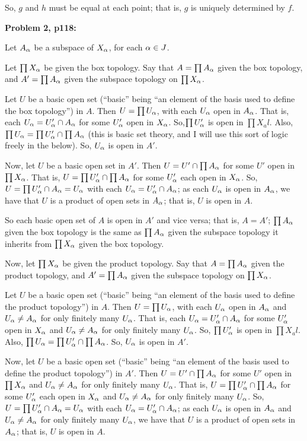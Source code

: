 \documentclass[a4paper,12pt]{article}
\begin{document}
So, $g$ and $h$ must be equal at each point; that is, $g$ is uniquely determined by $f$.

\shunt

{\bf Problem 2, p118:}

Let $A_\alpha$ be a subspace of $X_\alpha$, for each $\alpha \in J$. 

Let $\prod X_\alpha$ be given the box topology. Say that $A = \prod A_\alpha$ given the box topology, and $A' = \prod A_\alpha$ given the subspace topology on $\prod X_\alpha$.

Let $U$ be a basic open set (``basic'' being ``an element of the basis used to define the box topology'') in $A$. Then $U = \prod U_\alpha$, with each $U_\alpha$ open in $A_\alpha$. That is, each $U_\alpha = U'_\alpha \cap A_\alpha$ for some $U'_\alpha$ open in $X_\alpha$. So,$\prod U'_\alpha$ is open in $\prod X_al$. Also, $\prod U_\alpha = \prod U'_\alpha \cap \prod A_\alpha$ (this is basic set theory, and I will use this sort of logic freely in the below).
So, $U_\alpha$ is open in $A'$.

Now, let $U$ be a basic open set in $A'$. Then $U = U' \cap \prod A_\alpha$ for some $U'$ open in $\prod X_\alpha$. That is, $U = \prod U'_\alpha \cap \prod A_\alpha$ for some $U'_\alpha$ each open in $X_\alpha$. So, $U = \prod U'_\alpha \cap A_\alpha = U_\alpha$ with each $U_\alpha = U'_\alpha \cap A_\alpha$; as each $U_\alpha$ is open in $A_\alpha$, we have that $U$ is a product of open sets in $A_\alpha$; that is, $U$ is open in $A$.

So each basic open set of $A$ is open in $A'$ and vice versa; that is, $A = A'$; $\prod A_\alpha$ given the box topology is the same as $\prod A_\alpha$ given the subspace topology it inherits from $\prod X_\alpha$ given the box topology.

Now, let $\prod X_\alpha$ be given the product topology. Say that $A = \prod A_\alpha$ given the product topology, and $A' = \prod A_\alpha$ given the subspace topology on $\prod X_\alpha$.

Let $U$ be a basic open set (``basic'' being ``an element of the basis used to define the product topology'') in $A$. Then $U = \prod U_\alpha$, with each $U_\alpha$ open in $A_\alpha$ and $U_\alpha \neq A_\alpha$ for only finitely many $U_\alpha$. That is, each $U_\alpha = U'_\alpha \cap A_\alpha$ for some $U'_\alpha$ open in $X_\alpha$ and $U_\alpha \neq A_\alpha$ for only finitely many $U_\alpha$. So, $\prod U'_\alpha$ is open in $\prod X_al$. Also, $\prod U_\alpha = \prod U'_\alpha \cap \prod A_\alpha$. %
So, $U_\alpha$ is open in $A'$.

Now, let $U$ be a basic open set (``basic'' being ``an element of the basis used to define the product topology'') in $A'$. Then $U = U' \cap \prod A_\alpha$ for some $U'$ open in $\prod X_\alpha$ and $U_\alpha \neq A_\alpha$ for only finitely many $U_\alpha$. That is, $U = \prod U'_\alpha \cap \prod A_\alpha$ for some $U'_\alpha$ each open in $X_\alpha$ and $U_\alpha \neq A_\alpha$ for only finitely many $U_\alpha$. So, $U = \prod U'_\alpha \cap A_\alpha = U_\alpha$ with each $U_\alpha = U'_\alpha \cap A_\alpha$; as each $U_\alpha$ is open in $A_\alpha$ and $U_\alpha \neq A_\alpha$ for only finitely many $U_\alpha$, we have that $U$ is a product of open sets in $A_\alpha$; that is, $U$ is open in $A$.
\end{document}
